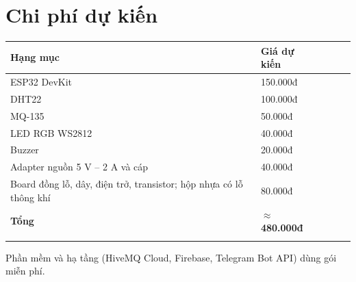 \documentclass[12pt,a4paper]{article}
\newcommand{\outerline}{\Xhline{0.9pt}}
\begin{document}
\noindent\begin{minipage}{\linewidth}
\setlength{\parskip}{6pt}
\section{Chi phí dự kiến}
\begin{center}
\begin{tabular}{I L{8cm} i r I}
\outerline
\textbf{Hạng mục} & \textbf{Giá dự kiến} \\
\hline
ESP32 DevKit & 150.000đ \\
\hline
DHT22 & 100.000đ \\
\hline
MQ-135 & 50.000đ \\
\hline
LED RGB WS2812 & 40.000đ \\
\hline
Buzzer & 20.000đ \\
\hline
Adapter nguồn 5 V -- 2 A và cáp & 40.000đ \\
\hline
Board đồng lỗ, dây, điện trở, transistor; hộp nhựa có lỗ thông khí & 80.000đ \\
\hline
\textbf{Tổng} & \textbf{$\approx$ 480.000đ} \\
\outerline
\end{tabular}
\end{center}
Phần mềm và hạ tầng (HiveMQ Cloud, Firebase, Telegram Bot API) dùng gói miễn phí.
\end{minipage}
\par\bigskip
\end{document}
